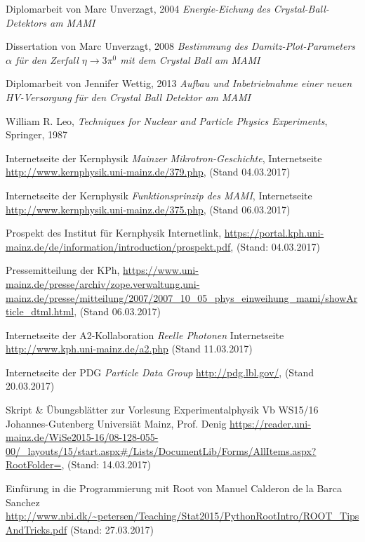 \documentclass[a4paper,11pt,oneside,final,german,openbib,pdftex]{scrbook}
\begin{document}
{\begin{appendix}
\renewcommand{\bibname}{\bfont Literaturverzeichnis} 

\begin{thebibliography}{99}
	
 Diplomarbeit von Marc Unverzagt, 2004 {\em Energie-Eichung des Crystal-Ball-Detektors am MAMI}

 Dissertation von Marc Unverzagt, 2008 {\em Bestimmung des Damitz-Plot-Parameters $\alpha$ für den Zerfall $ \eta \rightarrow 3\pi^{0} $ mit dem Crystal Ball am MAMI}

 Diplomarbeit von Jennifer Wettig, 2013 {\em Aufbau und Inbetriebnahme einer neuen HV-Versorgung für den Crystal Ball Detektor am MAMI}

 William R. Leo, \textit{Techniques for Nuclear and Particle Physics Experiments}, Springer, 1987


 Internetseite der Kernphysik {\em Mainzer Mikrotron-Geschichte}, Internetseite \url{http://www.kernphysik.uni-mainz.de/379.php}, (Stand 04.03.2017)

 Internetseite der Kernphysik {\em Funktionsprinzip des MAMI}, Internetseite \url{http://www.kernphysik.uni-mainz.de/375.php}, (Stand 06.03.2017)

 Prospekt des Institut für Kernphysik Internetlink, \url{https://portal.kph.uni-mainz.de/de/information/introduction/prospekt.pdf}, (Stand: 04.03.2017)

 Pressemitteilung der KPh, \url{https://www.uni-mainz.de/presse/archiv/zope.verwaltung.uni-mainz.de/presse/mitteilung/2007/2007_10_05_phys_einweihung_mami/showArticle_dtml.html}, (Stand 06.03.2017)

 Internetseite der A2-Kollaboration {\em Reelle Photonen}
Internetseite \url{http://www.kph.uni-mainz.de/a2.php} (Stand 11.03.2017)

 Internetseite der PDG {\em Particle Data Group} \url{http://pdg.lbl.gov/}, (Stand 20.03.2017)

 Skript \& Übungsblätter zur Vorlesung Experimentalphysik Vb WS15/16 Johannes-Gutenberg Universi\"at Mainz, Prof. Denig \url{https://reader.uni-mainz.de/WiSe2015-16/08-128-055-00/_layouts/15/start.aspx#/Lists/DocumentLib/Forms/AllItems.aspx?RootFolder=}, (Stand: 14.03.2017)

 Einf\"urung in die Programmierung mit Root von Manuel Calderon de la Barca Sanchez \url{http://www.nbi.dk/~petersen/Teaching/Stat2015/PythonRootIntro/ROOT_TipsAndTricks.pdf} (Stand: 27.03.2017)


\end{thebibliography}
\end{appendix}}
\end{document}

